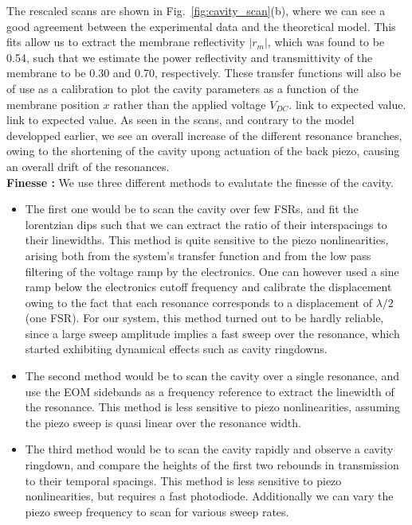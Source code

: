 The rescaled scans are shown in Fig.~\ref{fig:cavity_scan}(b), where we can see a good agreement between the experimental data and the theoretical model. This fits allow us to extract the membrane reflectivity $|r_m|$, which was found to be 0.54, such that we estimate the power reflectivity and transmittivity of the membrane to be  0.30 and 0.70, respectively. These transfer functions will also be of use as a calibration to plot the cavity parameters as a function of the membrane position $x$ rather than the applied voltage $V_{DC}$. \color{red} link to expected value\color{black}. \\

\color{red} link to expected value\color{black}. As seen in the scans, and contrary to the model developped earlier, we see an overall increase of the different resonance branches, owing to the shortening of the cavity upong actuation of the back piezo, causing an overall drift of the resonances. \\

\noindent  \textbf{Finesse :} We use three different methods to evalutate the finesse of the cavity. 
\begin{itemize}
  \item The first one would be to scan the cavity over few FSRs, and fit the lorentzian dips such that we can extract the ratio of their interspacings to their linewidths. This method is quite sensitive to the piezo nonlinearities, arising both from the system's transfer function and from the low pass filtering of the voltage ramp by the electronics. One can however used a sine ramp below the electronics cutoff frequency and calibrate the displacement owing to the fact that each resonance corresponds to a displacement of $\lambda/2$ (one FSR). For our system, this method turned out to be hardly reliable, since a large sweep amplitude implies a fast sweep over the resonance, which started exhibiting dynamical effects such as cavity ringdowns. 
  \item The second method would be to scan the cavity over a single resonance, and use the EOM sidebands as a frequency reference to extract the linewidth of the resonance. This method is less sensitive to piezo nonlinearities, assuming the piezo sweep is quasi linear over the resonance width. 
  \item The third method would be to scan the cavity rapidly and observe a cavity ringdown, and compare the heights of the first two rebounds in transmission to their temporal spacings. This method is less sensitive to piezo nonlinearities, but requires a fast photodiode. Additionally we can vary the piezo sweep frequency to scan for various sweep rates. 
\end{itemize}

